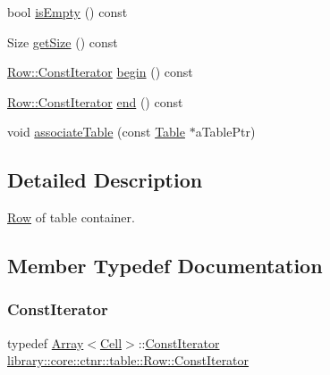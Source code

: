 \begin{DoxyCompactItemize}
\item 
bool \hyperlink{classlibrary_1_1core_1_1ctnr_1_1table_1_1_row_a3edb92bce425c8eca7b470ab8517df0a}{is\+Empty} () const
\item 
Size \hyperlink{classlibrary_1_1core_1_1ctnr_1_1table_1_1_row_a5e284f42caed1acf1df7c6655d0b93e0}{get\+Size} () const
\item 
\hyperlink{classlibrary_1_1core_1_1ctnr_1_1table_1_1_row_a293725deae1bf660d85c2d3ce905cb40}{Row\+::\+Const\+Iterator} \hyperlink{classlibrary_1_1core_1_1ctnr_1_1table_1_1_row_ac95a4df6fc29ca17d567e6a4560a2e9b}{begin} () const
\item 
\hyperlink{classlibrary_1_1core_1_1ctnr_1_1table_1_1_row_a293725deae1bf660d85c2d3ce905cb40}{Row\+::\+Const\+Iterator} \hyperlink{classlibrary_1_1core_1_1ctnr_1_1table_1_1_row_af7d6f076abf692bf84d412c42c840685}{end} () const
\item 
void \hyperlink{classlibrary_1_1core_1_1ctnr_1_1table_1_1_row_a1afbb0660b89062d230da20a46ee6335}{associate\+Table} (const \hyperlink{classlibrary_1_1core_1_1ctnr_1_1_table}{Table} $\ast$a\+Table\+Ptr)
\end{DoxyCompactItemize}


\subsection{Detailed Description}
\hyperlink{classlibrary_1_1core_1_1ctnr_1_1table_1_1_row}{Row} of table container. 

\subsection{Member Typedef Documentation}
\mbox{\label{classlibrary_1_1core_1_1ctnr_1_1table_1_1_row_a293725deae1bf660d85c2d3ce905cb40}} 
\subsubsection{\texorpdfstring{Const\+Iterator}{ConstIterator}}
{\footnotesize\ttfamily typedef \hyperlink{classlibrary_1_1core_1_1ctnr_1_1_array}{Array}$<$\hyperlink{namespacelibrary_1_1core_1_1ctnr_1_1table_aac6007d595b2967513e8e6b89f6092f5}{Cell}$>$\+::\hyperlink{classlibrary_1_1core_1_1ctnr_1_1table_1_1_row_a293725deae1bf660d85c2d3ce905cb40}{Const\+Iterator} \hyperlink{classlibrary_1_1core_1_1ctnr_1_1table_1_1_row_a293725deae1bf660d85c2d3ce905cb40}{library\+::core\+::ctnr\+::table\+::\+Row\+::\+Const\+Iterator}}



